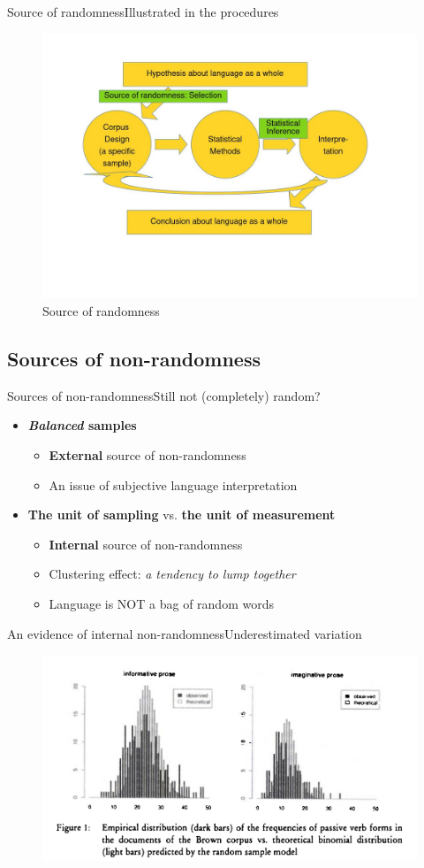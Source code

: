 \begin{frame}{Source of randomness}{Illustrated in the procedures}
	\begin{figure}
		\includegraphics[width=.7\textwidth]{Figures/Randomness.jpg}
		\caption{Source of randomness}
	\end{figure}
\end{frame}


\subsection{Sources of non-randomness}
\begin{frame}[t]{Sources of non-randomness}{Still not (completely) random?}
	
	\begin{itemize}
		\item \textbf{\textit{Balanced} samples}
		\begin{itemize}
			\item \textbf{External} source of non-randomness
			\item An issue of subjective language interpretation
		\end{itemize}
		\bigbreak
		
		\item \textbf{The unit of sampling} vs. \textbf{the unit of measurement}
		\begin{itemize}
			\item \textbf{Internal} source of non-randomness
			\item Clustering effect: \textit{a tendency to lump together}
			\item Language is NOT a bag of random words
		\end{itemize}
	\end{itemize}

\end{frame}

\begin{frame}{An evidence of internal non-randomness}{Underestimated variation}
	\begin{figure}
		\includegraphics[width=.7\textwidth]{Figures/Distribution.png}
	\end{figure}
\end{frame}


